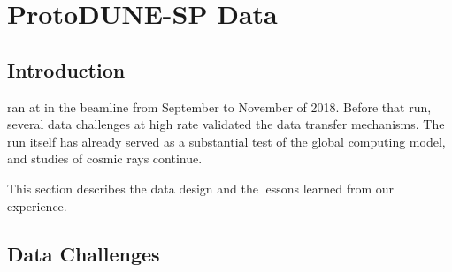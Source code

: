 \section{ProtoDUNE-SP Data}
\label{sec:exec-comp-proto-SP}

\subsection{Introduction}
\label{sec:exec-proto-intro}

 ran at  in the  beamline from September to November of 2018. Before that run, several data challenges at high rate validated the data transfer mechanisms. The run itself has already served as a  
substantial test of the global computing model, and studies of cosmic rays continue.

This section describes the  data design and the lessons learned from our experience. %

\subsection{Data Challenges}

